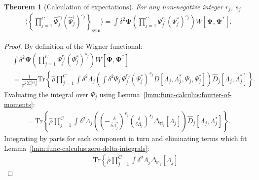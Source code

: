 \documentclass[12pt,aip,jmp,amssymb,amsmath]{revtex4-1}
\newtheorem{theorem}{Theorem}
\begin{document}
\begin{theorem}[Calculation of expectations]
\label{thm:func-wigner:moments}
    For any non-negative integer $r_j$, $s_j$
    \begin{equation*}\begin{split}
        \langle \left\{ \prod_{j=1}^C \hat{\Psi}_j^{r_j} (\hat{\Psi}_j^\dagger)^{s_j} \right\}_{\mathrm{sym}} \rangle
        = \int \delta^2 \boldsymbol{\Psi}
            \left( \prod_{j=1}^C \Psi_j^{r_j} (\Psi_j^*)^{s_j} \right) W[\boldsymbol{\Psi}, \boldsymbol{\Psi}^*].
    \end{split}\end{equation*}
\end{theorem}
\begin{proof}
By definition of the Wigner functional:
\begin{equation}\begin{split}
    & \int \delta^2\boldsymbol{\Psi} \left( \prod_{j=1}^C \Psi_j^{r_j} (\Psi_j^*)^{s_j} \right) W[\boldsymbol{\Psi}, \boldsymbol{\Psi}^*] \\
    & = \frac{1}{\pi^{2\sum|\mathbb{M}_j|}} \mathrm{Tr} \left\{ \hat{\rho}
        \prod_{j=1}^C
            \int \delta^2 \Lambda_j \left(
                \int \delta^2 \Psi_j\, \Psi_j^{r_j} (\Psi_j^*)^{s_j}
                D[\Lambda_j, \Lambda_j^*, \Psi_j, \Psi_j^*]
            \right)
            \hat{D}_j[\Lambda_j, \Lambda_j^*]
    \right\}.
\end{split}\end{equation}
Evaluating the integral over $\Psi_j$ using Lemma~\ref{lmm:func-calculus:fourier-of-moments}:
\begin{equation}\begin{split}
    = \mathrm{Tr} \left\{ \hat{\rho}
        \prod_{j=1}^C
            \int \delta^2 \Lambda_j \left(
                \left( -\frac{\delta}{\delta \Lambda_j^*} \right)^{r_j}
                \left( \frac{\delta}{\delta \Lambda_j} \right)^{s_j}
                \Delta_{\mathbb{M}_j}[\Lambda_j]
            \right)
            \hat{D}_j[\Lambda_j, \Lambda_j^*]
    \right\}.
\end{split}\end{equation}
Integrating by parts for each component in turn and eliminating terms which fit Lemma~\ref{lmm:func-calculus:zero-delta-integrals}:
\begin{equation}\begin{split}
    & = \mathrm{Tr} \left\{ \hat{\rho}
        \prod_{j=1}^C \int \delta^2 \Lambda_j
            \Delta_{\mathbb{M}_j}[\Lambda_j]

\end{split}
\end{equation}
\end{proof}
\end{document}
